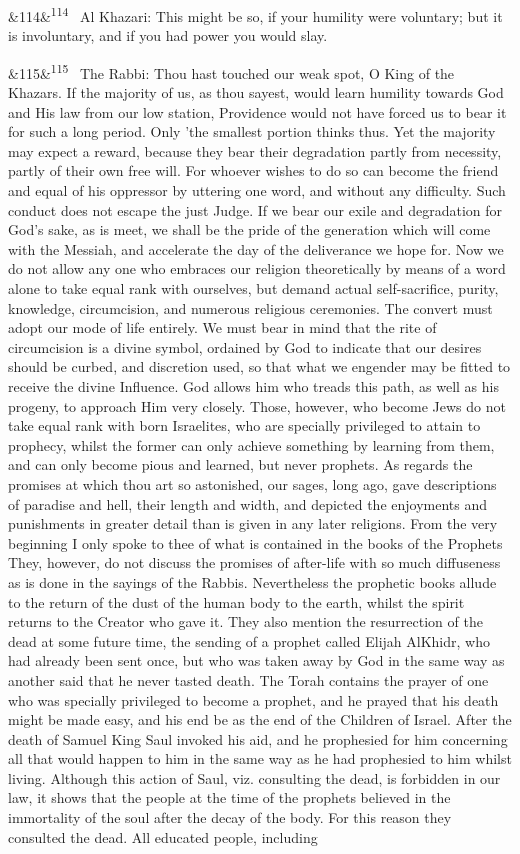 \documentclass[12pt]{article}
\newcommand{\para}[1][]{\par\noindent\ifx&#1&\else\textsuperscript{\footnotesize #1}~\fi}
\begin{document}
\para[114] Al Khazari: This might be so, if your humility were voluntary; but it is involuntary, and if you had power you would slay.

\para[115] The Rabbi: Thou hast touched our weak spot, O King of the Khazars. If the majority of us, as thou sayest, would learn humility towards God and His law from our low station, Providence would not have forced us to bear it for such a long period. Only 'the smallest portion thinks thus. Yet the majority may expect a reward, because they bear their degradation partly from necessity, partly of their own free will. For whoever wishes to do so can become the friend and equal of his oppressor by uttering one word, and without any difficulty. Such conduct does not escape the just Judge. If we bear our exile and degradation for God's sake, as is meet, we shall be the pride of the generation which will come with the Messiah, and accelerate the day of the deliverance we hope for. Now we do not allow any one who embraces our religion theoretically by means of a word alone to take equal rank with ourselves, but demand actual self-sacrifice, purity, knowledge, circumcision, and numerous religious ceremonies. The convert must adopt our mode of life entirely. We must bear in mind that the rite of circumcision is a divine symbol, ordained by God to indicate that our desires should be curbed, and discretion used, so that what we engender may be fitted to receive the divine Influence. God allows him who treads this path, as well as his progeny, to approach Him very closely. Those, however, who become Jews do not take equal rank with born Israelites, who are specially privileged to attain to prophecy, whilst the former can only achieve something by learning from them, and can only become pious and learned, but never prophets. As regards the promises at which thou art so astonished, our sages, long ago, gave descriptions of paradise and hell, their length and width, and depicted the enjoyments and punishments in greater detail than is given in any later religions. From the very beginning I only spoke to thee of what is contained in the books of the Prophets They, however, do not discuss the promises of after-life with so much diffuseness as is done in the sayings of the Rabbis. Nevertheless the prophetic books allude to the return of the dust of the human body to the earth, whilst the spirit returns to the Creator who gave it. They also mention the resurrection of the dead at some future time, the sending of a prophet called Elijah AlKhidr, who had already been sent once, but who was taken away by God in the same way as another said that he never tasted death. The Torah contains the prayer of one who was specially privileged to become a prophet, and he prayed that his death might be made easy, and his end be as the end of the Children of Israel. After the death of Samuel King Saul invoked his aid, and he prophesied for him concerning all that would happen to him in the same way as he had prophesied to him whilst living. Although this action of Saul, viz. consulting the dead, is forbidden in our law, it shows that the people at the time of the prophets believed in the immortality of the soul after the decay of the body. For this reason they consulted the dead. All educated people, including 
\end{document}
